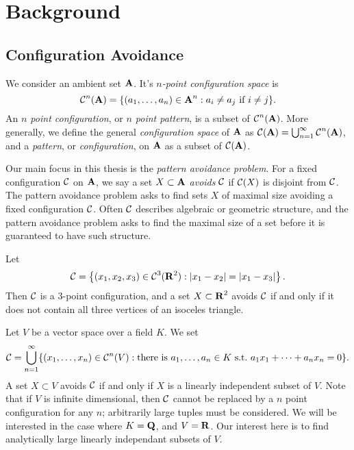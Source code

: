 
\chapter{Background}
\label{ch:Background}

\section{Configuration Avoidance}

We consider an ambient set $\operatorname{\mathbf{A}}$. It's \emph{$n$-point configuration space} is
%
\[ \operatorname{\mathcal{C}}^n(\operatorname{\mathbf{A}}) = \{ (a_1, \dots, a_n) \in \operatorname{\mathbf{A}}^n: a_i \neq a_j\ \text{if $i \neq j$} \}. \]
%
An \emph{$n$ point configuration}, or \emph{$n$ point pattern}, is a subset of $\operatorname{\mathcal{C}}^n(\operatorname{\mathbf{A}})$. More generally, we define the general \emph{configuration space} of $\operatorname{\mathbf{A}}$ as $\operatorname{\mathcal{C}}(\operatorname{\mathbf{A}}) = \bigcup_{n = 1}^\infty \operatorname{\mathcal{C}}^n(\operatorname{\mathbf{A}})$, and a \emph{pattern}, or \emph{configuration}, on $\operatorname{\mathbf{A}}$ as a subset of $\operatorname{\mathcal{C}}(\operatorname{\mathbf{A}})$.

Our main focus in this thesis is the \emph{pattern avoidance problem}. For a fixed configuration $\operatorname{\mathcal{C}}$ on $\operatorname{\mathbf{A}}$, we say a set $X \subset \operatorname{\mathbf{A}}$ \emph{avoids} $\operatorname{\mathcal{C}}$ if $\operatorname{\mathcal{C}}(X)$ is disjoint from $\operatorname{\mathcal{C}}$. The pattern avoidance problem asks to find sets $X$ of maximal size avoiding a fixed configuration $\operatorname{\mathcal{C}}$. Often $\operatorname{\mathcal{C}}$ describes algebraic or geometric structure, and the pattern avoidance problem asks to find the maximal size of a set before it is guaranteed to have such structure.

\begin{example}
	Let
	\[ \operatorname{\mathcal{C}} = \left\{ (x_1, x_2, x_3) \in \operatorname{\mathcal{C}}^3(\operatorname{\mathbf{R}}^2) : |x_1-x_2| = |x_1-x_3| \right\}. \]
	Then $\operatorname{\mathcal{C}}$ is a 3-point configuration, and a set $X \subset \operatorname{\mathbf{R}}^2$ avoids $\operatorname{\mathcal{C}}$ if and only if it does not contain all three vertices of an isoceles triangle. %
\end{example}

\begin{example}
	Let $V$ be a vector space over a field $K$. We set
	\[ \C = \bigcup_{n = 1}^\infty \{ (x_1, \dots, x_n) \in \C^n(V): \text{there is}\ a_1, \dots, a_n \in K\ \text{s.t.}\ a_1x_1 + \dots + a_nx_n = 0 \}. \]
	A set $X \subset V$ avoids $\operatorname{\mathcal{C}}$ if and only if $X$ is a linearly independent subset of $V$. Note that if $V$ is infinite dimensional, then $\operatorname{\mathcal{C}}$ cannot be replaced by a $n$ point configuration for any $n$; arbitrarily large tuples must be considered. We will be interested in the case where $K = \operatorname{\mathbf{Q}}$, and $V = \operatorname{\mathbf{R}}$. Our interest here is to find analytically large linearly independant subsets of $V$.
\end{example}

